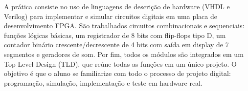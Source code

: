 
A prática consiste no uso de linguagens de descrição de hardware (VHDL e Verilog) para implementar e simular circuitos digitais em uma placa de desenvolvimento FPGA. São trabalhados circuitos combinacionais e sequenciais: funções lógicas básicas, um registrador de 8 bits com flip-flops tipo D, um contador binário crescente/decrescente de 4 bits com saída em display de 7 segmentos e geradores de som. Por fim, todos os módulos são integrados em um Top Level Design (TLD), que reúne todas as funções em um único projeto. O objetivo é que o aluno se familiarize com todo o processo de projeto digital: programação, simulação, implementação e teste em hardware real.